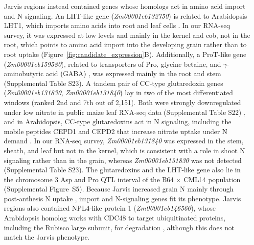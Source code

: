 \documentclass[namedate,unnumsec,webpdf,contemporary,large]{oup-authoring-template}
\begin{document}
Jarvis regions instead contained genes whose homologs act in amino acid import and N signaling. An LHT-like gene (\textit{Zm00001eb132750}) is related to Arabidopsis LHT1, which imports amino acids into root and leaf cells \citep{Hirner2006LHT1}. In our RNA-seq survey, it was expressed at low levels and mainly in the kernel and cob, not in the root, which points to amino acid import into the developing grain rather than to root uptake (Figure~\ref{fig:candidate_expression}B). Additionally, a ProT-like gene (\textit{Zm00001eb159580}), related to transporters of Pro, glycine betaine, and $\gamma$-aminobutyric acid (GABA) \citep{Lehmann2011ProT}, was expressed mainly in the root and stem (Supplemental Table S23). A tandem pair of CC-type glutaredoxin genes (\textit{Zm00001eb131830}, \textit{Zm00001eb131840}) lay in two of the most differentiated windows (ranked 2nd and 7th out of 2,151). Both were strongly downregulated under low nitrate in public maize leaf RNA-seq data (Supplemental Table S22) \citep{MaizExpressN, Mu2017LN, Guo2022LN, Ma2021LN, TorresRodriguez2021LN, AlonsoNieves2022LN, Wang2025NRT25}, and in Arabidopsis, CC-type glutaredoxins act in N signaling, including the mobile peptides CEPD1 and CEPD2 that increase nitrate uptake under N demand \citep{Patterson2016GRX, Ohkubo2017CEPD}. In our RNA-seq survey, \textit{Zm00001eb131840} was expressed in the stem, sheath, and leaf but not in the kernel, which is consistent with a role in shoot N signaling rather than in the grain, whereas \textit{Zm00001eb131830} was not detected (Supplemental Table S23). The glutaredoxins and the LHT-like gene also lie in the chromosome 3 Asp and Pro QTL interval of the B64 $\times$ CML14 population (Supplemental Figure~S5). Because Jarvis increased grain N mainly through post-anthesis N uptake \citep{Moll1994}, import and N-signaling genes fit its phenotype. Jarvis regions also contained NPL4-like protein 1 (\textit{Zm00001eb146560}), whose Arabidopsis homolog works with CDC48 to target ubiquitinated proteins, including the Rubisco large subunit, for degradation \citep{Li2022CDC48}, although this does not match the Jarvis phenotype.
\end{document}
